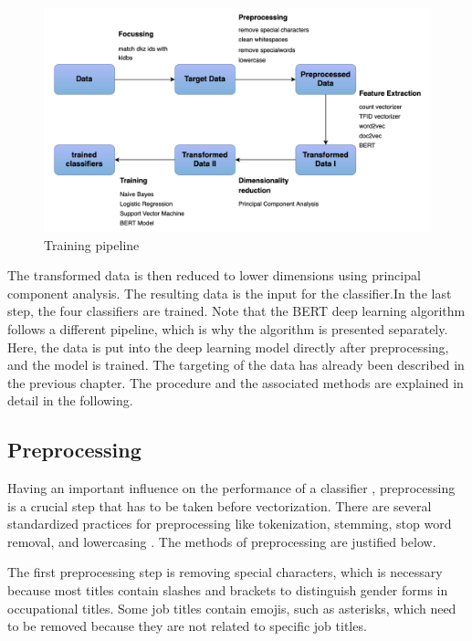 \documentclass[12pt, a4paper, titlepage]{article}
\begin{document}
\begin{figure}[hb!]
  \center
  \includegraphics[scale=0.5]{pipeline_MA.png}
  \caption{\label{fig: F8} Training pipeline}
\end{figure}

The transformed data is then reduced to lower dimensions using principal component analysis. The resulting data is the input for the classifier.In the last step, the four classifiers are trained. Note that the \ac{BERT} deep learning algorithm follows a different pipeline, which is why the algorithm is presented separately. Here, the data is put into the deep learning model directly after preprocessing, and the model is trained. The targeting of the data has already been described in the previous chapter. The procedure and the associated methods are explained in detail in the following.

\subsection{Preprocessing}
Having an important influence on the performance of a classifier \citep{uysal2014, hacohen2020, gonccalves2005}, preprocessing is a crucial step that has to be taken before vectorization. There are several standardized practices for preprocessing like tokenization, stemming, stop word removal, and lowercasing \citep{alsmadi2019}. The methods of preprocessing are justified below.

The first preprocessing step is removing special characters, which is necessary because most titles contain slashes and brackets to distinguish gender forms in occupational titles. Some job titles contain emojis, such as asterisks, which need to be removed because they are not related to specific job titles. 
\end{document}
